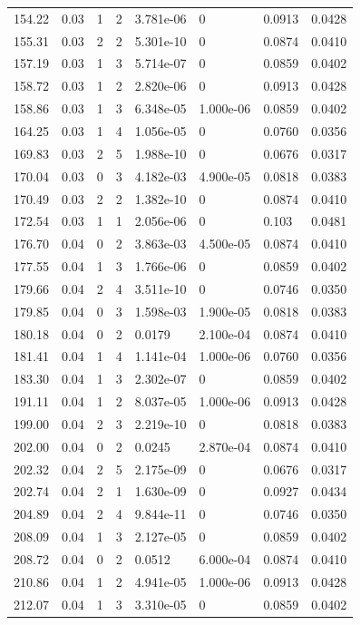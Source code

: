 \documentclass[preview]{standalone}
\begin{document}
{{{\begin{tabular}{L{1.2cm}C{1.2cm} C{0.3cm}C{0.5cm} C{1.4cm}C{1.4cm} C{1.4cm}C{1.4cm}}
  154.22  &  0.03  & 1     &  2 &  3.781e-06  & 0  & 0.0913 &  0.0428   \\ 
  155.31  &  0.03  & 2     &  2 &  5.301e-10  & 0  & 0.0874 &  0.0410   \\ 
  157.19  &  0.03  & 1     &  3 &  5.714e-07  & 0  & 0.0859 &  0.0402   \\ 
  158.72  &  0.03  & 1     &  2 &  2.820e-06  & 0  & 0.0913 &  0.0428   \\ 
  158.86  &  0.03  & 1     &  3 &  6.348e-05  & 1.000e-06  & 0.0859 &  0.0402   \\ 
  164.25  &  0.03  & 1     &  4 &  1.056e-05  & 0  & 0.0760 &  0.0356   \\ 
  169.83  &  0.03  & 2     &  5 &  1.988e-10  & 0  & 0.0676 &  0.0317   \\ 
  170.04  &  0.03  & 0     &  3 &  4.182e-03  & 4.900e-05  & 0.0818 &  0.0383   \\ 
  170.49  &  0.03  & 2     &  2 &  1.382e-10  & 0  & 0.0874 &  0.0410   \\ 
  172.54  &  0.03  & 1     &  1 &  2.056e-06  & 0  & 0.103 &  0.0481   \\ 
  176.70  &  0.04  & 0     &  2 &  3.863e-03  & 4.500e-05  & 0.0874 &  0.0410   \\ 
  177.55  &  0.04  & 1     &  3 &  1.766e-06  & 0  & 0.0859 &  0.0402   \\ 
  179.66  &  0.04  & 2     &  4 &  3.511e-10  & 0  & 0.0746 &  0.0350   \\ 
  179.85  &  0.04  & 0     &  3 &  1.598e-03  & 1.900e-05  & 0.0818 &  0.0383   \\ 
  180.18  &  0.04  & 0     &  2 &  0.0179  & 2.100e-04  & 0.0874 &  0.0410   \\ 
  181.41  &  0.04  & 1     &  4 &  1.141e-04  & 1.000e-06  & 0.0760 &  0.0356   \\ 
  183.30  &  0.04  & 1     &  3 &  2.302e-07  & 0  & 0.0859 &  0.0402   \\ 
  191.11  &  0.04  & 1     &  2 &  8.037e-05  & 1.000e-06  & 0.0913 &  0.0428   \\ 
  199.00  &  0.04  & 2     &  3 &  2.219e-10  & 0  & 0.0818 &  0.0383   \\ 
  202.00  &  0.04  & 0     &  2 &  0.0245  & 2.870e-04  & 0.0874 &  0.0410   \\ 
  202.32  &  0.04  & 2     &  5 &  2.175e-09  & 0  & 0.0676 &  0.0317   \\ 
  202.74  &  0.04  & 2     &  1 &  1.630e-09  & 0  & 0.0927 &  0.0434   \\ 
  204.89  &  0.04  & 2     &  4 &  9.844e-11  & 0  & 0.0746 &  0.0350   \\ 
  208.09  &  0.04  & 1     &  3 &  2.127e-05  & 0  & 0.0859 &  0.0402   \\ 
  208.72  &  0.04  & 0     &  2 &  0.0512  & 6.000e-04  & 0.0874 &  0.0410   \\ 
  210.86  &  0.04  & 1     &  2 &  4.941e-05  & 1.000e-06  & 0.0913 &  0.0428   \\ 
  212.07  &  0.04  & 1     &  3 &  3.310e-05  & 0  & 0.0859 &  0.0402   \\ 
\hline 
\end{tabular} 

}}}
\end{document}
